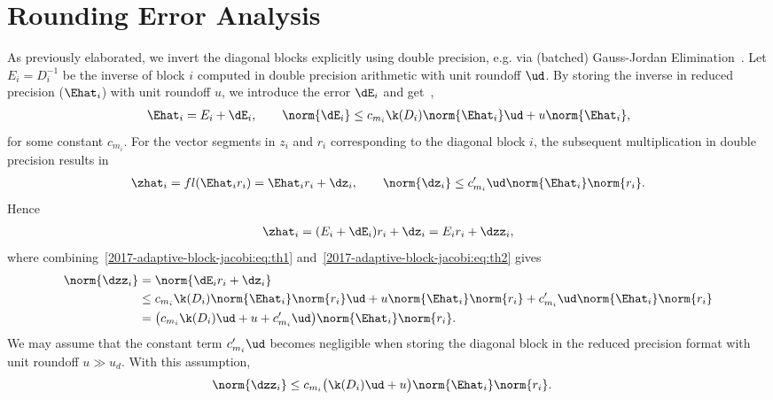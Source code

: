 \section{Rounding Error Analysis}
\label{2017-adaptive-block-jacobi:sec:erroranalysis}

As previously elaborated, we invert the diagonal blocks explicitly using double 
precision, e.g. via (batched) Gauss-Jordan Elimination~\cite{ANZT2018,gje}.
Let $E_i = D_i^{-1}$ be the inverse of block $i$ computed in
double precision arithmetic with unit roundoff $\ud$.
By storing the inverse in reduced precision ($\Ehat_i$) with unit roundoff $u$, 
we introduce the error $\dE_i$ and get~\cite{duhi92},
\cite[secs.~14.3, 14.4]{higham2}
\begin{align}
   \Ehat_i  = E_i + \dE_i,
   \qquad 
   \norm{\dE_i} \le c_{m_i} \k(D_i) \norm{\Ehat_i}\ud 
                 + u \norm{\Ehat_i},
\label{2017-adaptive-block-jacobi:eq:th1}
\end{align}
for some constant $c_{m_i}$.
For the vector segments in $z_i$ and $r_i$ corresponding to the diagonal block 
$i$, the subsequent multiplication in double precision results
in~\cite[sec.~3.5]{higham2}
\begin{align}
  \zhat_i = fl(\Ehat_i r_i) = \Ehat_i r_i + \dz_i,
\qquad  \norm{\dz_i} \le c_{m_i}' \ud \norm{\Ehat_i} \norm{r_i}.
\label{2017-adaptive-block-jacobi:eq:th2}
\end{align}
Hence 
\begin{align}
  \zhat_i = (E_i + \dE_i) r_i + \dz_i
= E_i r_i + \dzz_i,
\end{align}
where combining~\eqref{2017-adaptive-block-jacobi:eq:th1} and~\eqref{2017-adaptive-block-jacobi:eq:th2} gives
\begin{align}
  \norm{\dzz_i} &= \norm{\dE_i r_i + \dz_i}\nonumber\\
                &\le c_{m_i} \k(D_i) \norm{\Ehat_i}\norm{r_i}\ud 
                 + u \norm{\Ehat_i}\norm{r_i} 
                 + c_{m_i}' \ud \norm{\Ehat_i} \norm{r_i}\nonumber\\
                &= \bigl(c_{m_i} \k(D_i)\ud 
                 + u + c_{m_i}' \ud\bigr) \norm{\Ehat_i} \norm{r_i}.
\label{2017-adaptive-block-jacobi:eq:th4}
\end{align}
We may assume that the constant term $c_{m_i}' \ud$ becomes negligible when 
storing the diagonal block in the reduced precision format with unit roundoff 
$u\gg u_d$. With this assumption,
\begin{align}
\norm{\dzz_i} &\le c_{m_i} \bigl(\k(D_i)\ud 
+  u\bigr) \norm{\Ehat_i} \norm{r_i}.
\label{2017-adaptive-block-jacobi:eq:th5}
\end{align}


